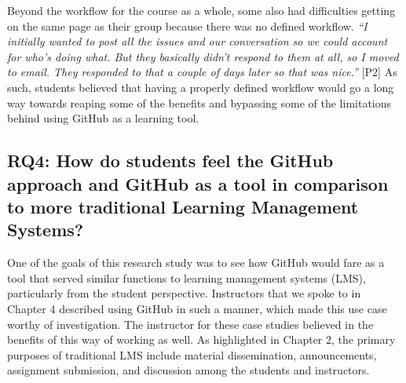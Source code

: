 Beyond the workflow for the course as a whole, some also had difficulties getting on the same page as their group because there was no defined workflow. \textit{``I initially wanted to post all the issues and our conversation so we could account for who's doing what. But they basically didn't respond to them at all, so I moved to email. They responded to that a couple of days later so that was nice.''} [P2] As such, students believed that having a properly defined workflow would go a long way towards reaping some of the benefits and bypassing some of the limitations behind using GitHub as a learning tool.





\subsection{RQ4: How do students feel the GitHub approach and GitHub as a tool in comparison to more traditional Learning Management Systems?}
One of the goals of this research study was to see how GitHub would fare as a tool that served similar functions to learning management systems (LMS), particularly from the student perspective. Instructors that we spoke to in Chapter 4 described using GitHub in such a manner, which made this use case worthy of investigation. The instructor for these case studies believed in the benefits of this way of working as well. As highlighted in Chapter 2, the primary purposes of traditional LMS include material dissemination, announcements, assignment submission, and discussion among the students and instructors.

